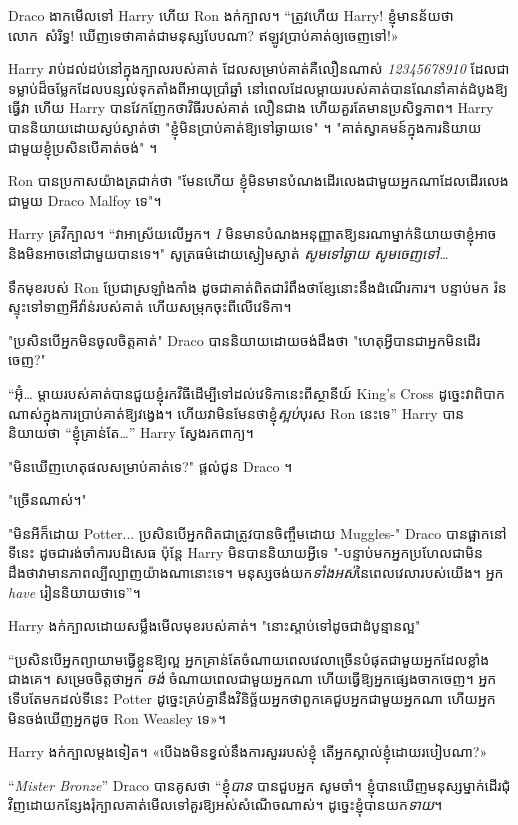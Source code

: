 Draco ងាកមើលទៅ Harry ហើយ Ron ងក់ក្បាល។ “ត្រូវហើយ Harry! ខ្ញុំមានន័យថាលោក~សំរិទ្ធ! ឃើញទេថាគាត់ជាមនុស្សបែបណា? ឥឡូវ​ប្រាប់​គាត់​ឲ្យ​ចេញ​ទៅ!»

Harry រាប់ដល់ដប់នៅក្នុងក្បាលរបស់គាត់ ដែលសម្រាប់គាត់គឺលឿនណាស់ \emph{12345678910} ដែលជាទម្លាប់ដ៏ចម្លែកដែលបន្សល់ទុកតាំងពីអាយុប្រាំឆ្នាំ នៅពេលដែលម្តាយរបស់គាត់បានណែនាំគាត់ដំបូងឱ្យធ្វើវា ហើយ Harry បានវែកញែកថាវិធីរបស់គាត់ លឿនជាង ហើយគួរតែមានប្រសិទ្ធភាព។ Harry បាននិយាយដោយស្ងប់ស្ងាត់ថា "ខ្ញុំមិនប្រាប់គាត់ឱ្យទៅឆ្ងាយទេ" ។ "គាត់ស្វាគមន៍ក្នុងការនិយាយជាមួយខ្ញុំប្រសិនបើគាត់ចង់" ។

Ron បាន​ប្រកាស​យ៉ាង​ត្រជាក់​ថា "មែន​ហើយ ខ្ញុំ​មិន​មាន​បំណង​ដើរ​លេង​ជាមួយ​អ្នក​ណា​ដែល​ដើរ​លេង​ជាមួយ Draco Malfoy ទេ"។

Harry គ្រវីក្បាល។ “វាអាស្រ័យលើអ្នក។ \emph{I} មិនមានបំណងអនុញ្ញាតឱ្យនរណាម្នាក់និយាយថាខ្ញុំអាច និងមិនអាចនៅជាមួយបានទេ។" សូត្រធម៌ដោយស្ងៀមស្ងាត់ \emph{សូមទៅឆ្ងាយ សូមចេញទៅ…}

ទឹកមុខរបស់ Ron ប្រែជាស្រឡាំងកាំង ដូចជាគាត់ពិតជារំពឹងថាខ្សែនោះនឹងដំណើរការ។ បន្ទាប់មក រ៉ន ស្ទុះទៅទាញអីវ៉ាន់របស់គាត់ ហើយសម្រុកចុះពីលើវេទិកា។

"ប្រសិនបើអ្នកមិនចូលចិត្តគាត់" Draco បាននិយាយដោយចង់ដឹងថា "ហេតុអ្វីបានជាអ្នកមិនដើរចេញ?"

“អ៊ុំ… ម្តាយរបស់គាត់បានជួយខ្ញុំរកវិធីដើម្បីទៅដល់វេទិកានេះពីស្ថានីយ៍ King's Cross ដូច្នេះវាពិបាកណាស់ក្នុងការប្រាប់គាត់ឱ្យវង្វេង។ ហើយវាមិនមែនថាខ្ញុំ\emph{ស្អប់}បុរស Ron នេះទេ” Harry បាននិយាយថា “ខ្ញុំគ្រាន់តែ…” Harry ស្វែងរកពាក្យ។

"មិនឃើញហេតុផលសម្រាប់គាត់ទេ?" ផ្តល់ជូន Draco ។

"ច្រើនណាស់។"

"មិនអីក៏ដោយ Potter... ប្រសិនបើអ្នកពិតជាត្រូវបានចិញ្ចឹមដោយ Muggles-" Draco បានផ្អាកនៅទីនេះ ដូចជារង់ចាំការបដិសេធ ប៉ុន្តែ Harry មិនបាននិយាយអ្វីទេ "-បន្ទាប់មកអ្នកប្រហែលជាមិនដឹងថាវាមានភាពល្បីល្បាញយ៉ាងណានោះទេ។ មនុស្សចង់យក\emph{ទាំងអស់}នៃពេលវេលារបស់យើង។ អ្នក \emph{have} រៀននិយាយថាទេ”។

Harry ងក់ក្បាលដោយសម្លឹងមើលមុខរបស់គាត់។ "នោះស្តាប់ទៅដូចជាដំបូន្មានល្អ"

“ប្រសិនបើអ្នកព្យាយាមធ្វើខ្លួនឱ្យល្អ អ្នកគ្រាន់តែចំណាយពេលវេលាច្រើនបំផុតជាមួយអ្នកដែលខ្លាំងជាងគេ។ សម្រេចចិត្តថាអ្នក \emph{ចង់} ចំណាយពេលជាមួយអ្នកណា ហើយធ្វើឱ្យអ្នកផ្សេងចាកចេញ។ អ្នកទើបតែមកដល់ទីនេះ Potter ដូច្នេះគ្រប់គ្នានឹងវិនិច្ឆ័យអ្នកថាពួកគេជួបអ្នកជាមួយអ្នកណា ហើយអ្នកមិនចង់ឃើញអ្នកដូច Ron Weasley ទេ»។

Harry ងក់ក្បាលម្តងទៀត។ «បើ​ឯង​មិន​ខ្វល់​នឹង​ការ​សួរ​របស់​ខ្ញុំ តើ​អ្នក​ស្គាល់​ខ្ញុំ​ដោយ​របៀប​ណា?»

“\emph{Mister Bronze}” Draco បានគូសថា “ខ្ញុំ\emph{បាន} បានជួបអ្នក សូមចាំ។ ខ្ញុំ​បាន​ឃើញ​មនុស្ស​ម្នាក់​ដើរ​ជុំវិញ​ដោយ​កន្សែង​រុំ​ក្បាល​គាត់​មើល​ទៅ​គួរ​ឱ្យ​អស់​សំណើច​ណាស់។ ដូច្នេះខ្ញុំបានយក\emph{ទាយ}។

